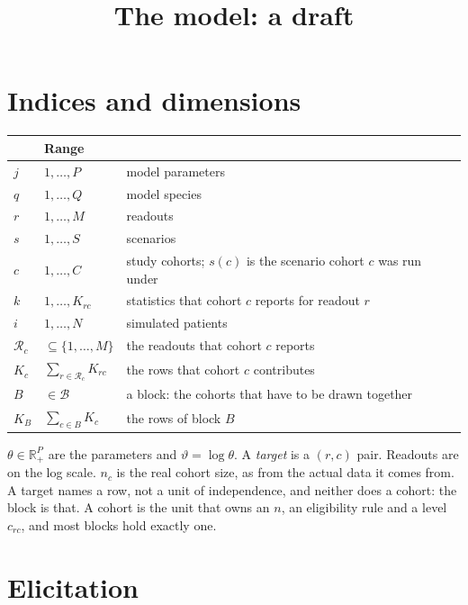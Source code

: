 \documentclass[11pt]{article}
\title{\bfseries The model: a draft}
\author{}
\date{}
\newcommand{\Rset}{\mathcal{R}}
\newcommand{\Bset}{\mathcal{B}}
\begin{document}
\maketitle
\vspace{-2.5em}

\section{Indices and dimensions}

\begin{center}\small
\begin{tabularx}{\textwidth}{@{}llX@{}}
\toprule
 & Range & \\
\midrule
$j$ & $1,\dots,P$ & model parameters \\
$q$ & $1,\dots,Q$ & model species \\
$r$ & $1,\dots,M$ & readouts \\
$s$ & $1,\dots,S$ & scenarios \\
$c$ & $1,\dots,C$ & study cohorts; $s(c)$ is the scenario cohort $c$ was run under \\
$k$ & $1,\dots,K_{rc}$ & statistics that cohort $c$ reports for readout $r$ \\
$i$ & $1,\dots,N$ & simulated patients \\
$\Rset_c$ & $\subseteq\{1,\dots,M\}$ & the readouts that cohort $c$ reports \\
$K_c$ & $\sum_{r\in\Rset_c}K_{rc}$ & the rows that cohort $c$ contributes \\
$B$ & $\in\Bset$ & a block: the cohorts that have to be drawn together \\
$K_B$ & $\sum_{c\in B}K_c$ & the rows of block $B$ \\
\bottomrule
\end{tabularx}
\end{center}

\noindent
$\theta\in\mathbb{R}^P_{+}$ are the parameters and $\vartheta=\log\theta$. A
\emph{target} is a $(r,c)$ pair. Readouts are on the log scale. $n_c$ is the real
cohort size, as from the actual data it comes from. A target names a row, not a
unit of independence, and neither does a cohort: the block is that. A cohort is
the unit that owns an $n$, an eligibility rule and a level $c_{rc}$, and most
blocks hold exactly one.

\section{Elicitation}
\label{sec:elicit}
\end{document}
